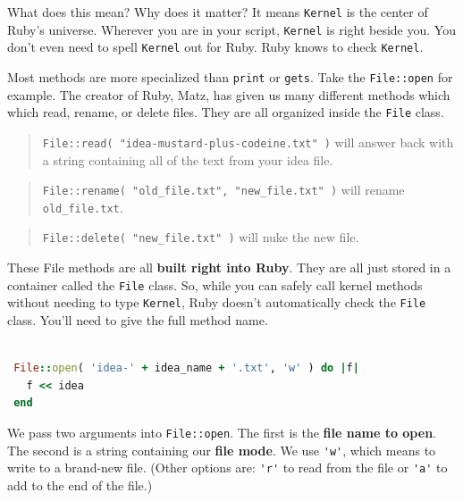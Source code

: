 \documentclass[10pt,twoside]{report}
\begin{document}
What does this mean?  Why does it matter?  It means
\lstinline[breaklines=true]|Kernel| is the center of Ruby's
universe. Wherever you are in your script,
\lstinline[breaklines=true]|Kernel| is right beside you.  You don't
even need to spell \lstinline[breaklines=true]|Kernel| out for Ruby.
Ruby knows to check \lstinline[breaklines=true]|Kernel|.

Most methods are more specialized than
\lstinline[breaklines=true]|print| or
\lstinline[breaklines=true]|gets|.  Take the
\lstinline[breaklines=true]|File::open| for example.  The creator of
Ruby, Matz, has given us many different methods which which read,
rename, or delete files.  They are all organized inside the
\lstinline[breaklines=true]|File| class.

\begin{quote}
\lstinline[breaklines=true]|File::read( "idea-mustard-plus-codeine.txt" )|
will answer back with a string containing all of the text from your
idea file.\end{quote}


\begin{quote}
\lstinline[breaklines=true]|File::rename( "old_file.txt", "new_file.txt" )| 
will rename
\lstinline[breaklines=true]|old_file.txt|.\end{quote}


\begin{quote}
\lstinline[breaklines=true]|File::delete( "new_file.txt" )| will nuke
the new file.\end{quote}


These File methods are all {\bf built right into Ruby}.  They are all
just stored in a container called the
\lstinline[breaklines=true]|File| class.  So, while you can safely
call kernel methods without needing to type
\lstinline[breaklines=true]|Kernel|, Ruby doesn't automatically check
the \lstinline[breaklines=true]|File| class. You'll need to give the
full method name.


\begin{lstlisting}[basicstyle=\ttfamily\color{basiccolor},
    commentstyle = \ttfamily\color{commentcolor},
    keywordstyle=\ttfamily\color{keywordscolor},
    stringstyle=\color{stringcolor},
    language=Ruby,
    basicstyle=\small\ttfamily,
    showstringspaces=false,
  ]

 File::open( 'idea-' + idea_name + '.txt', 'w' ) do |f|
   f << idea
 end

\end{lstlisting}

We pass two arguments into \lstinline[breaklines=true]|File::open|.
The first is the {\bf file name to open}.  The second is a string
containing our {\bf file mode}.  We use
\lstinline[breaklines=true]|'w'|, which means to write to a brand-new
file.  (Other options are: \lstinline[breaklines=true]|'r'| to read
from the file or \lstinline[breaklines=true]|'a'| to add to the end of
the file.)
\end{document}
